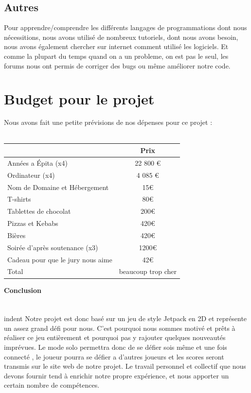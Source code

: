 \documentclass [11pt]{report}
\begin{document}
	\section {Autres}

	Pour apprendre/comprendre les différents langages de programmations dont nous nécessitions, nous avons utilisé de nombreux tutoriels, dont nous avons besoin, nous avons également chercher sur internet comment utilisé les logiciels. Et comme la plupart du temps quand on a un probleme, on est pas le seul, les forums nous ont permis de corriger des bugs ou même améliorer notre code.


\chapter {Budget pour le projet}
	Nous avons fait une petite prévisions de nos dépenses pour ce projet :\\\\

				\begin{tabular}{|l|c|}
				\hline
		 		 & Prix \\
				\hline
				Années a \'Epita (x4) & 22 800 € \\
				\hline
				Ordinateur (x4) & 4 085 €  \\
				\hline
				Nom de Domaine et Hébergement &  15€ \\
				\hline
				T-shirts & 80€ \\
				\hline
				Tablettes de chocolat & 200€ \\
				\hline
				Pizzas et Kebabs & 420€  \\
				\hline
				Bières  & 420€   \\
	          			 \hline
				Soirée d'après soutenance (x3) & 1200€\\
				\hline 
				Cadeau pour que le jury nous aime & 42€ \\
				\hline
				Total & beaucoup trop cher \\
				\hline
				
			\end{tabular}
\newpage
\textbf{{\Huge Conclusion}}\\
\\
\\indent	Notre projet est donc basé sur un jeu de style Jetpack en 2D et représente un assez grand défi pour nous. C’est pourquoi nous sommes motivé et prêts à réaliser ce jeu entièrement et pourquoi pas y rajouter quelques nouveautés imprévues. Le mode solo permettra donc de se défier sois même et une fois connecté , le joueur pourra se défier a d’autres joueurs et les scores seront transmis sur le site web de notre projet. Le travail personnel et collectif que nous devons fournir tend à enrichir notre propre expérience, et nous apporter un certain nombre de comp\'etences.
\end{document}
